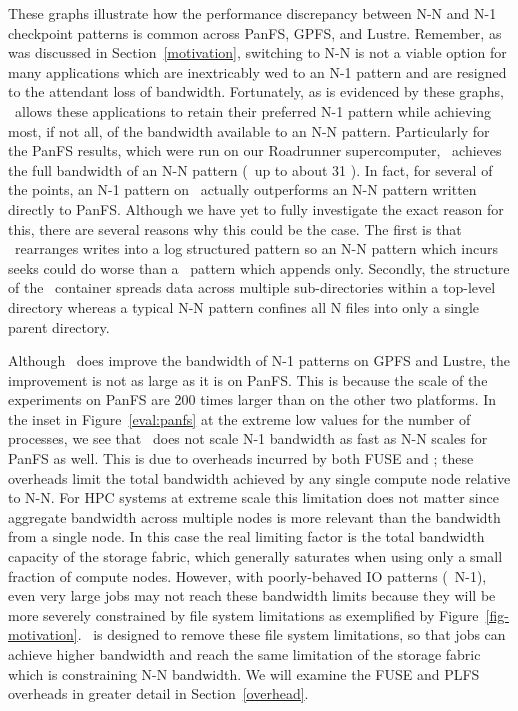 These graphs illustrate how the performance discrepancy between N-N
and N-1 checkpoint patterns is common across PanFS, GPFS,
and Lustre. Remember, as was discussed in Section~\ref{motivation}, switching
to N-N is not a viable option for many applications which are inextricably wed
to an N-1 pattern and are resigned to the attendant loss of bandwidth.
Fortunately, as is evidenced by these graphs, \plfs\ allows these applications
to retain their preferred N-1 pattern while achieving most, if not all, of the
bandwidth available to an N-N pattern. Particularly for the PanFS results,
which were run on our Roadrunner supercomputer, \plfs\ achieves the full
bandwidth of an N-N pattern (\ie\ up to about 31 \GBs). In fact, for several
of the points, an N-1 pattern on \plfs\ actually outperforms an N-N pattern
written directly to PanFS. Although we have yet to fully investigate the exact
reason for this, there are several reasons why this could be the case. The
first is that \plfs\ rearranges writes into a log structured pattern so an N-N
pattern which incurs seeks could do worse than a \plfs\ pattern which appends
only. Secondly, the structure of the \plfs\ container spreads data across
multiple sub-directories within a top-level directory whereas a typical N-N
pattern confines all N files into only a single parent directory.

Although \plfs\ does improve the bandwidth of N-1 patterns on GPFS and Lustre,
the improvement is not as large as it is on PanFS. This is because the scale of
the experiments on PanFS are 200 times larger than on the other two platforms.
In the inset in Figure~\ref{eval:panfs} at the extreme low values for the
number of processes, we see that \plfs\ does not scale N-1 bandwidth as fast as
N-N scales for PanFS as well. This is due to overheads incurred by both FUSE
and \plfs; these overheads limit the total bandwidth achieved by any single
compute node relative to N-N. For HPC systems at extreme scale this limitation
does not matter since aggregate bandwidth across multiple nodes is more
relevant than the bandwidth from a single node. In this case the real limiting
factor is the total bandwidth capacity of the storage fabric, which generally
saturates when using only a small fraction of compute nodes.  However, with
poorly-behaved IO patterns (\ie\ N-1), even very large jobs may not reach these
bandwidth limits because they will be more severely constrained by file system
limitations as exemplified by Figure~\ref{fig-motivation}. \plfs\ is designed
to remove these file system limitations, so that jobs can achieve higher
bandwidth and reach the same limitation of the storage fabric which is
constraining N-N bandwidth.  We will examine the FUSE and PLFS overheads in
greater detail in Section~\ref{overhead}. 
 
